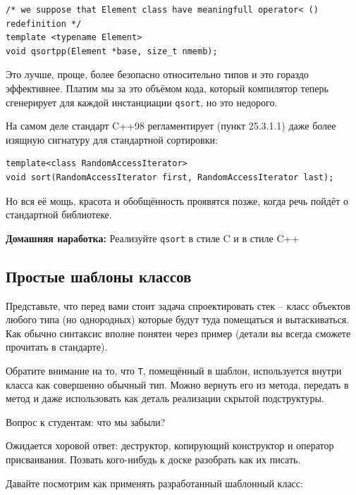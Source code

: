 \documentclass[a4paper,12pt,oneside]{article}
\begin{document}
\begin{lstlisting}
/* we suppose that Element class have meaningfull operator< () redefinition */
template <typename Element>
void qsortpp(Element *base, size_t nmemb);
\end{lstlisting}

Это лучше, проще, более безопасно относительно типов и это гораздо эффективнее. Платим мы за это объёмом кода, который компилятор теперь сгенерирует для каждой инстанциации \lstinline!qsort!, но это недорого.

На самом деле стандарт C++98 регламентирует (пункт 25.3.1.1) даже более изящную сигнатуру для стандартной сортировки:

\begin{lstlisting}
template<class RandomAccessIterator>
void sort(RandomAccessIterator first, RandomAccessIterator last);
\end{lstlisting}

Но вся её мощь, красота и обобщённость проявятся позже, когда речь пойдёт о стандартной библиотеке.

\textbf{Домашняя наработка:} Реализуйте \lstinline!qsort! в стиле C и в стиле C++

\subsection{Простые шаблоны классов}

Представьте, что перед вами стоит задача спроектировать стек – класс объектов любого типа (но однородных) которые будут туда помещаться и вытаскиваться. Как обычно синтаксис вполне понятен через пример (детали вы всегда сможете прочитать в стандарте).



Обратите внимание на то, что \lstinline!T!, помещённый в шаблон, используется внутри класса как совершенно обычный тип. Можно вернуть его из метода, передать в метод и даже использовать как деталь реализации скрытой подструктуры.



Вопрос к студентам: что мы забыли?

Ожидается хоровой ответ: деструктор, копирующий конструктор и оператор присваивания. Позвать кого-нибудь к доске разобрать как их писать.

Давайте посмотрим как применять разработанный шаблонный класс:
\end{document}
